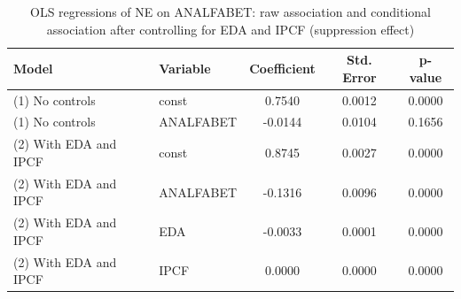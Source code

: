 \begin{table}
\caption{OLS regressions of NE on ANALFABET: raw association and conditional association after controlling for EDA and IPCF (suppression effect)}
\label{tab:analfabet_biv}
\begin{tabular}{llccc}
\toprule
Model & Variable & Coefficient & Std. Error & p-value \\
\midrule
(1) No controls & const & 0.7540 & 0.0012 & 0.0000 \\
(1) No controls & ANALFABET & -0.0144 & 0.0104 & 0.1656 \\
(2) With EDA and IPCF & const & 0.8745 & 0.0027 & 0.0000 \\
(2) With EDA and IPCF & ANALFABET & -0.1316 & 0.0096 & 0.0000 \\
(2) With EDA and IPCF & EDA & -0.0033 & 0.0001 & 0.0000 \\
(2) With EDA and IPCF & IPCF & 0.0000 & 0.0000 & 0.0000 \\
\bottomrule
\end{tabular}
\end{table}

